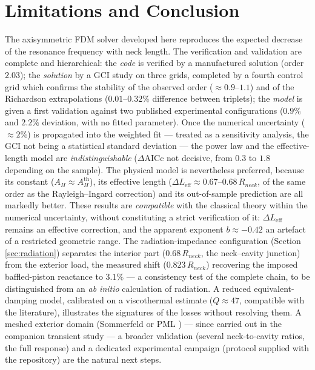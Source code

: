 \documentclass[11pt,a4paper,twocolumn]{article}
\begin{document}
\section{Limitations and Conclusion}
The axisymmetric FDM solver developed here reproduces the expected decrease of the resonance frequency with neck length. The verification and validation are complete and hierarchical: the \emph{code} is verified by a manufactured solution (order $2.03$); the \emph{solution} by a GCI study on three grids, completed by a fourth control grid which confirms the stability of the observed order ($\approx 0.9$--$1.1$) and of the Richardson extrapolations ($0.01$--$0.32\%$ difference between triplets); the \emph{model} is given a first validation against two published experimental configurations ($0.9\%$ and $2.2\%$ deviation, with no fitted parameter). Once the numerical uncertainty ($\approx2\%$) is propagated into the weighted fit --- treated as a sensitivity analysis, the GCI not being a statistical standard deviation --- the power law and the effective-length model are \emph{indistinguishable} ($\Delta\text{AICc}$ not decisive, from $0.3$ to $1.8$ depending on the sample). The physical model is nevertheless preferred, because its constant ($A_H\approx A_H^{\mathrm{th}}$), its effective length ($\Delta L_{\mathrm{eff}} \approx 0.67$--$0.68\,R_{neck}$, of the same order as the Rayleigh--Ingard correction) and its out-of-sample prediction are all markedly better. These results are \emph{compatible} with the classical theory within the numerical uncertainty, without constituting a strict verification of it: $\Delta L_{\mathrm{eff}}$ remains an effective correction, and the apparent exponent $b \approx -0.42$ an artefact of a restricted geometric range. The radiation-impedance configuration (Section \ref{sec:radiation}) separates the interior part ($0.68\,R_{neck}$, the neck--cavity junction) from the exterior load, the measured shift ($0.823\,R_{neck}$) recovering the imposed baffled-piston reactance to $3.1\%$ --- a consistency test of the complete chain, to be distinguished from an \emph{ab initio} calculation of radiation. A reduced equivalent-damping model, calibrated on a viscothermal estimate ($Q\approx47$, compatible with the literature), illustrates the signatures of the losses without resolving them. A meshed exterior domain (Sommerfeld or PML \cite{berenger1994perfectly}) --- since carried out in the companion transient study --- a broader validation (several neck-to-cavity ratios, the full response) and a dedicated experimental campaign (protocol supplied with the repository) are the natural next steps.



\end{document}
